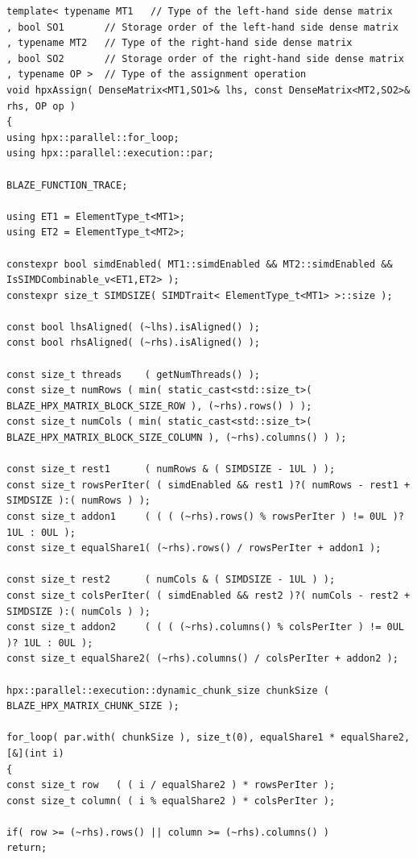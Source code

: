 \begin{lstlisting}[float,floatplacement=H,caption= {New implementation of Assign function for HPX backend in Blaze.}, label={new_hpx_backend}]
template< typename MT1   // Type of the left-hand side dense matrix
, bool SO1       // Storage order of the left-hand side dense matrix
, typename MT2   // Type of the right-hand side dense matrix
, bool SO2       // Storage order of the right-hand side dense matrix
, typename OP >  // Type of the assignment operation
void hpxAssign( DenseMatrix<MT1,SO1>& lhs, const DenseMatrix<MT2,SO2>& rhs, OP op )
{
using hpx::parallel::for_loop;
using hpx::parallel::execution::par;

BLAZE_FUNCTION_TRACE;

using ET1 = ElementType_t<MT1>;
using ET2 = ElementType_t<MT2>;

constexpr bool simdEnabled( MT1::simdEnabled && MT2::simdEnabled && IsSIMDCombinable_v<ET1,ET2> );
constexpr size_t SIMDSIZE( SIMDTrait< ElementType_t<MT1> >::size );

const bool lhsAligned( (~lhs).isAligned() );
const bool rhsAligned( (~rhs).isAligned() );

const size_t threads    ( getNumThreads() );
const size_t numRows ( min( static_cast<std::size_t>( BLAZE_HPX_MATRIX_BLOCK_SIZE_ROW ), (~rhs).rows() ) );
const size_t numCols ( min( static_cast<std::size_t>( BLAZE_HPX_MATRIX_BLOCK_SIZE_COLUMN ), (~rhs).columns() ) );

const size_t rest1      ( numRows & ( SIMDSIZE - 1UL ) );
const size_t rowsPerIter( ( simdEnabled && rest1 )?( numRows - rest1 + SIMDSIZE ):( numRows ) );
const size_t addon1     ( ( ( (~rhs).rows() % rowsPerIter ) != 0UL )? 1UL : 0UL );
const size_t equalShare1( (~rhs).rows() / rowsPerIter + addon1 );

const size_t rest2      ( numCols & ( SIMDSIZE - 1UL ) );
const size_t colsPerIter( ( simdEnabled && rest2 )?( numCols - rest2 + SIMDSIZE ):( numCols ) );
const size_t addon2     ( ( ( (~rhs).columns() % colsPerIter ) != 0UL )? 1UL : 0UL );
const size_t equalShare2( (~rhs).columns() / colsPerIter + addon2 );

hpx::parallel::execution::dynamic_chunk_size chunkSize ( BLAZE_HPX_MATRIX_CHUNK_SIZE );

for_loop( par.with( chunkSize ), size_t(0), equalShare1 * equalShare2, [&](int i)
{
const size_t row   ( ( i / equalShare2 ) * rowsPerIter );
const size_t column( ( i % equalShare2 ) * colsPerIter );

if( row >= (~rhs).rows() || column >= (~rhs).columns() )
return;


\end{lstlisting}
